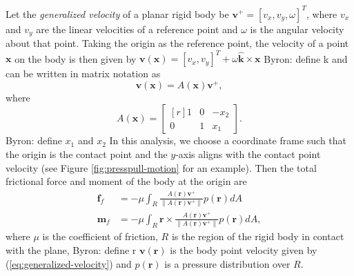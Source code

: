 \documentclass[conference]{IEEEtran}
\DeclareMathOperator{\sign}{\text{sgn}}
\newcommand{\BB}[1]{{\color{red} {Byron: {#1}}}}
\begin{document}
Let the \textit{generalized velocity} of a planar rigid body be
$\mathbf{v}^+ = [v_x, v_y, \omega]^T$, where $v_x$ and $v_y$ are the
linear velocities of a reference point and $\omega$ is the angular
velocity about that point. Taking the origin as the reference point,
the velocity of a point $\mathbf{x}$ on the body is then given by
$\mathbf{v}(\mathbf{x}) = [v_x, v_y]^T + \omega\hat{\mathbf{k}} \times
\mathbf{x}$ \BB{define k} and can be written in matrix notation as
\begin{equation} \label{eq:generalized-velocity}
\mathbf{v}(\mathbf{x}) = A(\mathbf{x})\mathbf{v}^+,
\end{equation}
where
\begin{equation}
  A(\mathbf{x}) = 
  \begin{bmatrix*}[r]
    1 & 0 & -x_2 \\
    0 & 1 &  x_1
  \end{bmatrix*}.
\end{equation}
%
\BB{define $x_1$ and $x_2$}
In this analysis, we choose a coordinate frame such that the origin is
the contact point and the $y$-axis aligns with the contact point
velocity (see Figure \ref{fig:presspull-motion} for an example). Then
the total frictional force and moment of the body at the origin are
\begin{align}
  \mathbf{f}_f &= -\mu\int_{R}\frac{A(\mathbf{r})\mathbf{v}^+}{\lVert A(\mathbf{r})\mathbf{v}^+ \rVert} p(\mathbf{r}) dA \\
  \mathbf{m}_f &= -\mu\int_{R}\mathbf{r}\times\frac{A(\mathbf{r})\mathbf{v}^+}{\lVert A(\mathbf{r})\mathbf{v}^+ \rVert} p(\mathbf{r}) dA, \label{eq:moment-at-contact}
\end{align}
where $\mu$ is the coefficient of friction, $R$ is the region of the
rigid body in contact with the plane, \BB{define r} $\mathbf{v}(\mathbf{r})$ is the
body point velocity given by (\ref{eq:generalized-velocity}) and
$p(\mathbf{r})$ is a pressure distribution over $R$.
\end{document}
